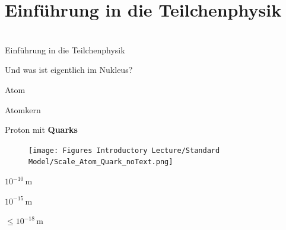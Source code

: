 \section{Einführung in die Teilchenphysik}
\begin{frame}[plain]
   \begin{center} 
  \huge{   }\\
   \Large{Einführung in die Teilchenphysik}
\end{center}
\end{frame}
\begin{frame}[t]{Und was ist eigentlich im Nukleus?}

    \begin{minipage}{\linewidth}
        \begin{minipage}{0.33\linewidth}
             \qquad Atom 
        \end{minipage}     
        \begin{minipage}{0.3\linewidth}
             \quad Atomkern 
        \end{minipage}    
        \begin{minipage}{0.33\linewidth}
            Proton mit \textbf{Quarks}
        \end{minipage}    
    \end{minipage} \vspace{0.5cm}
    
     \begin{minipage}{0.99\linewidth}
        \begin{figure}
            \centering
            \texttt{[image: Figures Introductory Lecture/Standard Model/Scale\_Atom\_Quark\_noText.png]}
            \label{fig:scale_atom_qaurk}
        \end{figure}
     \end{minipage}  
     \vspace{-15cm}
    \begin{minipage}{\linewidth}
        \begin{minipage}{0.33\linewidth}
            \qquad \Large $10^{-10}$\,m
        \end{minipage}     
        \begin{minipage}{0.33\linewidth}
             \quad \Large $10^{-15}$\,m
        \end{minipage}    
        \begin{minipage}{0.29\linewidth}
            \quad \Large $\leq10^{-18}$\,m
        \end{minipage}    
    \end{minipage}

\end{frame}

